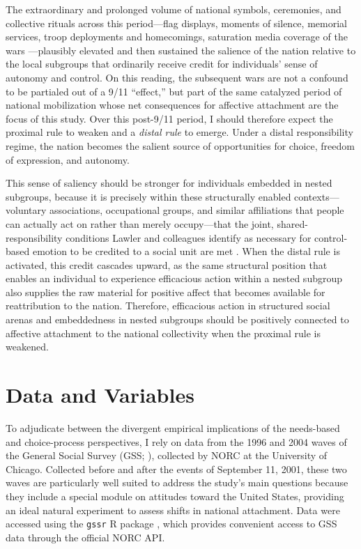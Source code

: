 \documentclass[12pt,letterpaper]{article}
\begin{document}
The extraordinary and prolonged volume of national symbols, ceremonies, and collective rituals across this period---flag displays, moments of silence, memorial services, troop deployments and homecomings, saturation media coverage of the wars \citep{collins2004rituals}---plausibly elevated and then sustained the salience of the nation relative to the local subgroups that ordinarily receive credit for individuals' sense of autonomy and control. On this reading, the subsequent wars are not a confound to be partialed out of a 9/11 ``effect,'' but part of the same catalyzed period of national mobilization whose net consequences for affective attachment are the focus of this study. Over this post-9/11 period, I should therefore expect the proximal rule to weaken and a \textit{distal rule} to emerge. Under a distal responsibility regime, the nation becomes the salient source of opportunities for choice, freedom of expression, and autonomy.

This sense of saliency should be stronger for individuals embedded in nested subgroups, because it is precisely within these structurally enabled contexts---voluntary associations, occupational groups, and similar affiliations that people can actually act on rather than merely occupy---that the joint, shared-responsibility conditions Lawler and colleagues identify as necessary for control-based emotion to be credited to a social unit are met \citep{lawler2006commitment-b3a}. When the distal rule is activated, this credit cascades upward, as the same structural position that enables an individual to experience efficacious action within a nested subgroup also supplies the raw material for positive affect that becomes available for reattribution to the nation. Therefore, efficacious action in structured social arenas and embeddedness in nested subgroups should be positively connected to affective attachment to the national collectivity when the proximal rule is weakened. 

\section{Data and Variables}

To adjudicate between the divergent empirical implications of the needs-based and choice-process perspectives, I rely on data from the 1996 and 2004 waves of the General Social Survey (GSS; \citealp{smith2021general-9ca}), collected by NORC at the University of Chicago. Collected before and after the events of September 11, 2001, these two waves are particularly well suited to address the study's main questions because they include a special module on attitudes toward the United States, providing an ideal natural experiment to assess shifts in national attachment. Data were accessed using the \texttt{gssr} R package \citep{healy2024gssr}, which provides convenient access to GSS data through the official NORC API.
\end{document}
